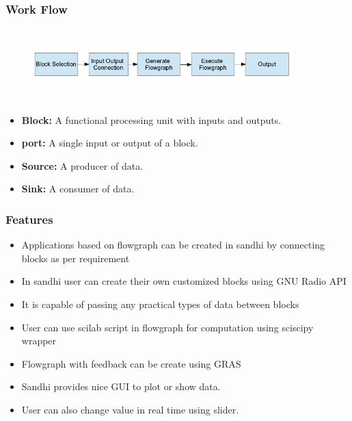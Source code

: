 \documentclass{beamer}
\begin{document}
\begin{frame}
\frametitle{Work Flow}
\vspace{-0.14in}
\begin{figure}
\centering
\includegraphics[height=2.8cm, width=10cm]{sandhi_presentation.png}
\end{figure}
\vspace{-0.2in}
\begin{itemize}
\item \textbf{Block:} A functional processing unit with inputs and outputs.
\item \textbf{port:} A single input or output of a block.
\item \textbf{Source:} A producer of data.
\item \textbf{Sink:} A consumer of data.
\end{itemize}
\end{frame}
\begin{frame}
\frametitle{Features}
\begin{itemize}
        \item Applications based on flowgraph can be created in sandhi by connecting blocks as per requirement
        \item In sandhi user can create their own customized blocks using GNU Radio API
        \item It is capable of passing any practical types of data between blocks
        \item User can use scilab script in flowgraph for computation using sciscipy wrapper
        \item Flowgraph with feedback can be create using GRAS
        \item Sandhi provides nice GUI to plot or show data.
        \item User can also change value in real time using slider.
\end{itemize}
\end{frame}
\end{document}
